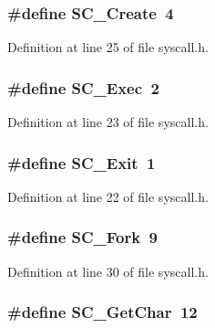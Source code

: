 \subsubsection[{S\+C\+\_\+\+Create}]{\setlength{\rightskip}{0pt plus 5cm}\#define S\+C\+\_\+\+Create~4}\label{syscall_8h_af37f41c7a3a4f4a03170cee55e3bdad3}


Definition at line 25 of file syscall.\+h.

\subsubsection[{S\+C\+\_\+\+Exec}]{\setlength{\rightskip}{0pt plus 5cm}\#define S\+C\+\_\+\+Exec~2}\label{syscall_8h_a021b6ef9e5f08a6d3a053ff25c4c0df2}


Definition at line 23 of file syscall.\+h.

\subsubsection[{S\+C\+\_\+\+Exit}]{\setlength{\rightskip}{0pt plus 5cm}\#define S\+C\+\_\+\+Exit~1}\label{syscall_8h_a171374af0ffab79442015ddea69786c2}


Definition at line 22 of file syscall.\+h.

\subsubsection[{S\+C\+\_\+\+Fork}]{\setlength{\rightskip}{0pt plus 5cm}\#define S\+C\+\_\+\+Fork~9}\label{syscall_8h_a81ceab9b3f7ebd0b510e9c7af670785b}


Definition at line 30 of file syscall.\+h.

\subsubsection[{S\+C\+\_\+\+Get\+Char}]{\setlength{\rightskip}{0pt plus 5cm}\#define S\+C\+\_\+\+Get\+Char~12}\label{syscall_8h_a277f8853bae1f93b67e3d12e19da57e9}


